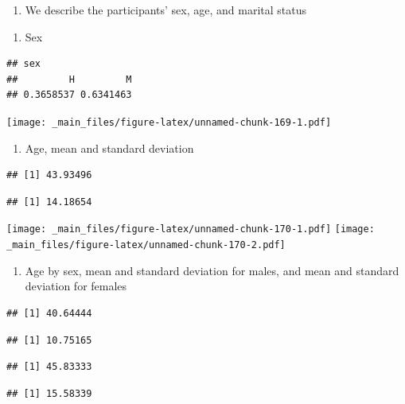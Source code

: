 \documentclass[
]{book}
\providecommand{\tightlist}{%
  \setlength{\itemsep}{0pt}\setlength{\parskip}{0pt}}
\begin{document}
\begin{enumerate}
\def\labelenumi{\arabic{enumi}.}
\tightlist
\item
  We describe the participants' sex, age, and marital status
\end{enumerate}

\begin{enumerate}
\def\labelenumi{\alph{enumi}.}
\tightlist
\item
  Sex
\end{enumerate}

\begin{verbatim}
## sex
##         H         M 
## 0.3658537 0.6341463
\end{verbatim}

\texttt{[image: \_main\_files/figure-latex/unnamed-chunk-169-1.pdf]}

\begin{enumerate}
\def\labelenumi{\alph{enumi}.}
\setcounter{enumi}{1}
\tightlist
\item
  Age, mean and standard deviation
\end{enumerate}

\begin{verbatim}
## [1] 43.93496
\end{verbatim}

\begin{verbatim}
## [1] 14.18654
\end{verbatim}

\texttt{[image: \_main\_files/figure-latex/unnamed-chunk-170-1.pdf]} \texttt{[image: \_main\_files/figure-latex/unnamed-chunk-170-2.pdf]}

\begin{enumerate}
\def\labelenumi{\alph{enumi}.}
\setcounter{enumi}{2}
\tightlist
\item
  Age by sex, mean and standard deviation for males, and mean and standard deviation for females
\end{enumerate}

\begin{verbatim}
## [1] 40.64444
\end{verbatim}

\begin{verbatim}
## [1] 10.75165
\end{verbatim}

\begin{verbatim}
## [1] 45.83333
\end{verbatim}

\begin{verbatim}
## [1] 15.58339
\end{verbatim}
\end{document}
